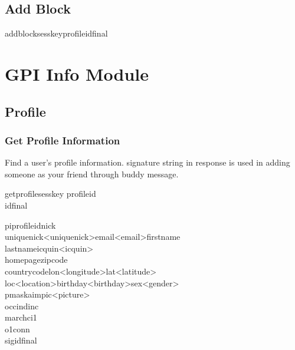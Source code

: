 \documentclass[oneside,titlepage,a4paper]{Definition/retrospy} %
\begin{document}
\subsection{Add Block}

\ClientRequest
\begin{mybox}
	\tbs addblock\tbs\tbs sesskey\tbs <session key>\tbs profileid\tbs <profile id>\tbs final\tbs
\end{mybox}



\section{GPI Info Module}
\subsection{Profile}
\subsubsection{Get Profile Information}
Find a user's profile information. signature string in response is used in adding someone as your friend through buddy message.
\ClientRequest

\begin{mybox}
	\tbs getprofile\tbs\tbs sesskey\tbs <session key>
	\tbs profileid\tbs <profile id>\\\tbs id\tbs <operation id>\tbs final\tbs
\end{mybox}
\ServerResponse

\begin{mybox}
	\tbs pi\tbs\tbs profileid\tbs <profile id>\tbs nick\tbs <nick name>\\\tbs uniquenick\tbs <uniquenick>\tbs email\tbs<email>\tbs firstname\tbs<first name>\\
	\tbs lastname\tbs <last name>\tbs icquin\tbs<icquin>\\
	\tbs homepage\tbs<home page URL>\tbs zipcode\tbs<zip code>\\
	\tbs countrycode\tbs<country code>\tbs lon\tbs <longitude>\tbs lat\tbs<latitude>\\
	\tbs loc\tbs<location>\tbs birthday\tbs<birthday>\tbs sex\tbs<gender>\\
	\tbs pmask\tbs<public mask>\tbs aim\tbs<aim name>\tbs pic\tbs <picture>\\
	\tbs occ\tbs<occupation id>\tbs ind\tbs<industry id>\tbs inc\tbs<income id>\\
	\tbs mar\tbs<married id>\tbs chc\tbs<child count number>\tbs i1\tbs<interest 1>\\
	\tbs  o1\tbs<ownership 1>\tbs conn\tbs<connection type id>\\
	\tbs sig\tbs<peer to peer signature>\tbs id\tbs <operation id>\tbs final\tbs
\end{mybox}
\end{document}
